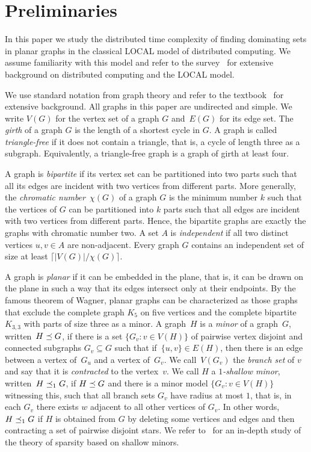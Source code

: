
\section{Preliminaries}

In this paper we study the distributed time complexity of finding
dominating sets in planar graphs in the classical LOCAL model of
distributed computing.
We assume familiarity with this model and refer to the survey~\cite{suomela2013survey} for extensive
background on distributed computing and the LOCAL model.

We use standard notation from graph theory and refer to the
textbook~\cite{diestel} for extensive background.  All graphs in this
paper are undirected and simple. We write $V(G)$ for the vertex set of
a graph $G$ and~$E(G)$ for its edge set. The \emph{girth} of a graph
$G$ is the length of a shortest cycle in $G$. A graph is called
\emph{triangle-free} if it does not contain a triangle, that is, a
cycle of length three as a subgraph. Equivalently, a triangle-free
graph is a graph of girth at least four.

A graph is \emph{bipartite} if its vertex set can be partitioned into
two parts such that all its edges are incident with two vertices from
different parts. More generally, the \emph{chromatic number}~$\chi(G)$
of a graph $G$ is the minimum number $k$ such that the vertices of $G$
can be partitioned into $k$ parts such that all edges are incident
with two vertices from different parts. Hence, the bipartite graphs
are exactly the graphs with chromatic number two. A set $A$ is
\emph{independent} if all two distinct vertices $u,v\in A$ are
non-adjacent.  Every graph $G$ contains an independent set of size at
least $\lceil|V(G)|/\chi(G)\rceil$.

\pagebreak
A graph is \emph{planar} if it can be embedded in the plane, that is,
it can be drawn on the plane in such a way that its edges intersect
only at their endpoints. By the famous theorem of Wagner, planar
graphs can be characterized as those graphs that exclude the complete
graph $K_5$ on five vertices and the complete bipartite $K_{3,3}$ with
parts of size three as a minor.  A graph~$H$ is a \emph{minor} of a
graph~$G$, written~$H\preceq G$, if there is a set
\mbox{$\{G_v :v\in V(H)\}$} of pairwise vertex disjoint and connected
subgraphs $G_v\subseteq G$ such that if~$\{u,v\}\in E(H)$, then there
is an edge between a vertex of~$G_u$ and a vertex of~$G_v$. We
call~$V(G_v)$ the \emph{branch set} of $v$ and say that it is
\emph{contracted} to the vertex~$v$.  We call $H$ a \emph{$1$-shallow
  minor}, written~$H\preceq_1 G$, if $H\preceq G$ and there is a minor
model \mbox{$\{G_v :v\in V(H)\}$} witnessing this, such that all
branch sets $G_v$ have radius at most $1$, that is, in each $G_v$
there exists $w$ adjacent to all other vertices of $G_v$. In other
words, $H\preceq_1 G$ if $H$ is obtained from $G$ by deleting some
vertices and edges and then contracting a set of pairwise disjoint
stars. We refer to~\cite{nevsetvril2012sparsity} for an in-depth study
of the theory of sparsity based on shallow minors.

